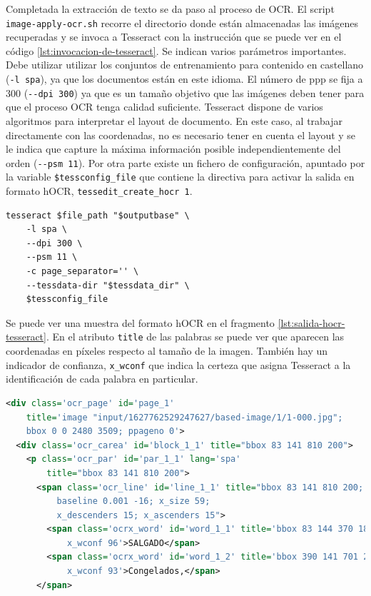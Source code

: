 Completada la extracción de texto se da paso al proceso de OCR. El script \verb|image-apply-ocr.sh| recorre el directorio donde están almacenadas las imágenes recuperadas y se invoca a Tesseract con la instrucción que se puede ver en el código \ref{lst:invocacion-de-tesseract}. Se indican varios parámetros importantes. Debe utilizar utilizar los conjuntos de entrenamiento para contenido en castellano (\verb|-l spa|), ya que los documentos están en este idioma. El número de \acrlong{ppp} se fija a 300 (\verb|--dpi 300|) ya que es un tamaño objetivo que las imágenes deben tener para que el proceso OCR tenga calidad suficiente. Tesseract dispone de varios algoritmos para interpretar el layout de documento. En este caso, al trabajar directamente con las coordenadas, no es necesario tener en cuenta el layout y se le indica que capture la máxima información posible independientemente del orden (\verb|--psm 11|). Por otra parte existe un fichero de configuración, apuntado por la variable \verb|$tessconfig_file| que contiene la directiva para activar la salida en formato hOCR, \verb|tessedit_create_hocr 1|.

\begin{lstlisting}[language=XML,caption={Extracción de texto con información de coordenadas},label=lst:invocacion-de-tesseract]
tesseract $file_path "$outputbase" \
    -l spa \
    --dpi 300 \
    --psm 11 \
    -c page_separator='' \
    --tessdata-dir "$tessdata_dir" \
    $tessconfig_file
\end{lstlisting}

Se puede ver una muestra del formato hOCR en el fragmento \ref{lst:salida-hocr-tesseract}. En el atributo \verb|title| de las palabras se puede ver que aparecen las coordenadas en píxeles respecto al tamaño de la imagen. También hay un indicador de confianza, \verb|x_wconf| que indica la certeza que asigna Tesseract a la identificación de cada palabra en particular.

\begin{lstlisting}[language=XML,caption={Fragmento de la salida hOCR de Tesseract},label=lst:salida-hocr-tesseract]
<div class='ocr_page' id='page_1' 
    title='image "input/1627762529247627/based-image/1/1-000.jpg"; 
    bbox 0 0 2480 3509; ppageno 0'>
  <div class='ocr_carea' id='block_1_1' title="bbox 83 141 810 200">
    <p class='ocr_par' id='par_1_1' lang='spa' 
        title="bbox 83 141 810 200">
      <span class='ocr_line' id='line_1_1' title="bbox 83 141 810 200; 
          baseline 0.001 -16; x_size 59; 
          x_descenders 15; x_ascenders 15">
        <span class='ocrx_word' id='word_1_1' title='bbox 83 144 370 185; 
            x_wconf 96'>SALGADO</span>
        <span class='ocrx_word' id='word_1_2' title='bbox 390 141 701 200; 
            x_wconf 93'>Congelados,</span>
      </span>
\end{lstlisting}


